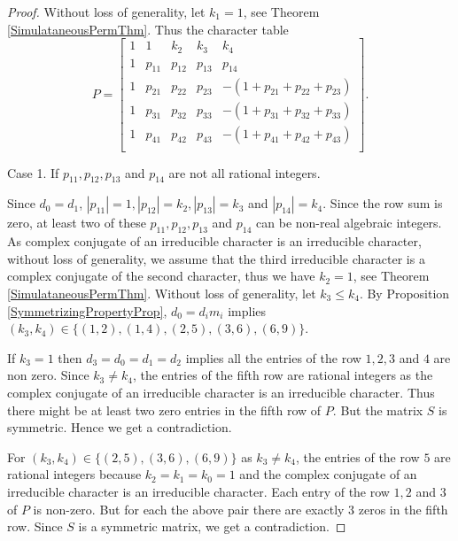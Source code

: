 \documentclass[12pt]{amsart}
\begin{document}
\begin{proof}

Without loss of generality, let $k_1=1$, see Theorem \ref{SimulataneousPermThm}. Thus the character table
$$P=\left[
   \begin{array}{ccccc}
     1 & 1 & k_2 & k_3&k_4\\
     1 & p_{11} &   p_{12} & p_{13}&p_{14}\\
     1 &  p_{21} &  p_{22}&  p_{23}& -(1+p_{21} +  p_{22}+  p_{23})\\
     1 &  p_{31} &  p_{32}&  p_{33}& -(1+p_{31} +  p_{32}+  p_{33})\\
     1 &  p_{41} &  p_{42}&  p_{43}& -(1+p_{41} +  p_{42}+  p_{43})\\
   \end{array}
 \right].$$

Case 1. If $p_{11},  p_{12}, p_{13}$ and  $p_{14}$ are not all rational integers.

\smallskip

Since $d_0=d_1$, $|p_{11}|=1, |p_{12}|=k_2, |p_{13}|=k_3$ and $|p_{14}|=k_4$. Since the row sum is zero, at least two of these $p_{11},  p_{12}, p_{13}$ and  $p_{14}$ can be non-real algebraic integers. As complex conjugate of an irreducible character is an irreducible character, without loss of generality, we assume that the third irreducible character is a complex conjugate of the second character, thus we have $k_2=1$, see Theorem \ref{SimulataneousPermThm}. Without loss of generality, let $k_3\leq k_4$.  By Proposition \ref{SymmetrizingPropertyProp}, $d_0=d_im_i$  implies $(k_3,k_4) \in \{(1, 2),
(1, 4),
(2, 5),
(3, 6),
(6, 9)
\}$.

If $k_3=1$ then $d_3=d_0=d_1=d_2$ implies all the entries of the row $1,2,3$ and $4$ are non zero. Since $k_3\neq k_4$, the entries of the fifth row  are rational integers as the complex conjugate of an irreducible character is an irreducible character. Thus there might be at least two zero entries in the fifth row of $P$. But the matrix $S$ is symmetric. Hence we get a contradiction.

For $(k_3,k_4) \in \{(2, 5),
(3, 6),
(6, 9)
\}$ as $k_3\neq k_4$, the entries of the row $5$ are rational integers because $k_2=k_1=k_0=1$ and the complex conjugate of an irreducible character is an irreducible character. Each entry of the row $1, 2$ and $3$ of $P$ is non-zero. But for each the above pair there are exactly $3$ zeros in the fifth row. Since $S$ is a symmetric matrix, we get a contradiction.


\end{proof}
\end{document}

